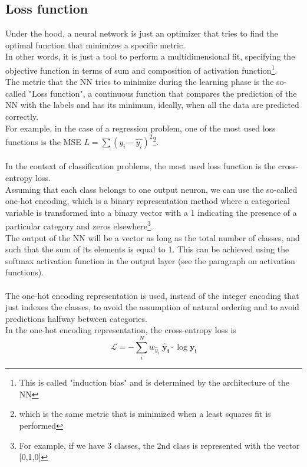 \subsection{Loss function}
Under the hood, a neural network is just an optimizer that tries to find the optimal function that minimizes a specific metric.\\
In other words, it is just a tool to perform a multidimensional fit, specifying the objective function in terms of sum and composition of activation function\footnote{This is called "induction bias" and is determined by the architecture of the NN}.\\
The metric that the NN tries to minimize during the learning phase is the so-called "Loss function", a continuous function that compares the prediction of the NN with the labels and has its minimum, ideally, when all the data are predicted correctly.\\
For example, in the case of a regression problem, one of the most used loss functions is the MSE $L=\sum(y_i-\hat{y_i})^2$\footnote{which is the same metric that is minimized when a least squares fit is performed}.\\
\\
In the context of classification problems, the most used loss function is the cross-entropy loss.\\
Assuming that each class belongs to one output neuron, we can use the so-called one-hot encoding, which is a binary representation method where a categorical variable is transformed into a binary vector with a 1 indicating the presence of a particular category and zeros elsewhere\footnote{For example, if we have 3 classes, the 2nd class is represented with the vector [0,1,0]}.\\
The output of the NN will be a vector as long as the total number of classes, and such that the sum of its elements is equal to 1. This can be achieved using the softmax activation function in the output layer (see the paragraph on activation functions).
\\
\\
The one-hot encoding representation is used, instead of the integer encoding that just indexes the classes, to avoid the assumption of natural ordering and to avoid predictions halfway between categories.\\
In the one-hot encoding representation, the cross-entropy loss is
\begin{equation}
    \mathcal{L}=-\sum_i^N w_{\hat{y}_i} \; \bm{\hat{y}_i} \cdot \log \bm{y_i}
\end{equation}
